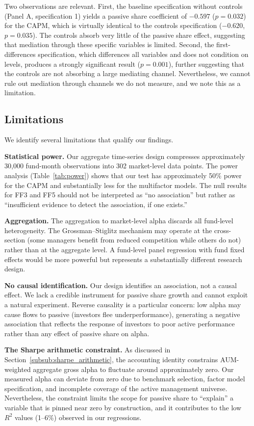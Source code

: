 \documentclass[11pt, a4paper]{article}
\begin{document}
Two observations are relevant. First, the baseline specification without controls (Panel A, specification 1) yields a passive share coefficient of $-0.597$ ($p = 0.032$) for the CAPM, which is virtually identical to the controls specification ($-0.620$, $p = 0.035$). The controls absorb very little of the passive share effect, suggesting that mediation through these specific variables is limited. Second, the first-differences specification, which differences all variables and does not condition on levels, produces a strongly significant result ($p = 0.001$), further suggesting that the controls are not absorbing a large mediating channel. Nevertheless, we cannot rule out mediation through channels we do not measure, and we note this as a limitation.

\subsection{Limitations}

We identify several limitations that qualify our findings.

\textbf{Statistical power.} Our aggregate time-series design compresses approximately 30,000 fund-month observations into 302 market-level data points. The power analysis (Table~\ref{tab:power}) shows that our test has approximately 50\% power for the CAPM and substantially less for the multifactor models. The null results for FF3 and FF5 should not be interpreted as ``no association'' but rather as ``insufficient evidence to detect the association, if one exists.''

\textbf{Aggregation.} The aggregation to market-level alpha discards all fund-level heterogeneity. The Grossman--Stiglitz mechanism may operate at the cross-section (some managers benefit from reduced competition while others do not) rather than at the aggregate level. A fund-level panel regression with fund fixed effects would be more powerful but represents a substantially different research design.

\textbf{No causal identification.} Our design identifies an association, not a causal effect. We lack a credible instrument for passive share growth and cannot exploit a natural experiment. Reverse causality is a particular concern: low alpha may cause flows to passive (investors flee underperformance), generating a negative association that reflects the response of investors to poor active performance rather than any effect of passive share on alpha.

\textbf{The Sharpe arithmetic constraint.} As discussed in Section~\ref{subsub:sharpe_arithmetic}, the \textcite{sharpe1991} accounting identity constrains AUM-weighted aggregate gross alpha to fluctuate around approximately zero. Our measured alpha can deviate from zero due to benchmark selection, factor model specification, and incomplete coverage of the active management universe. Nevertheless, the constraint limits the scope for passive share to ``explain'' a variable that is pinned near zero by construction, and it contributes to the low $R^2$ values (1--6\%) observed in our regressions.
\end{document}
